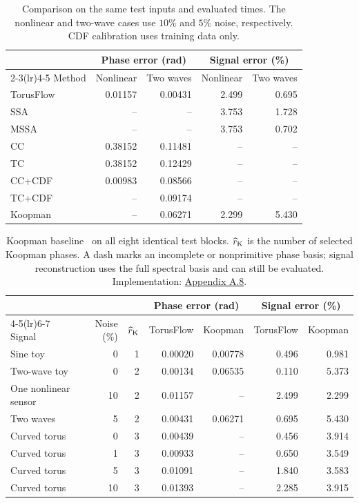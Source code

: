 \documentclass[11pt,a4paper]{article}
\begin{document}
\begin{table}[H]
\centering\small
\setlength{\tabcolsep}{9pt}
\begin{tabular}{lrrrr}
\toprule
& \multicolumn{2}{c}{Phase error (rad)} & \multicolumn{2}{c}{Signal error (\%)}\\
\cmidrule(lr){2-3}\cmidrule(lr){4-5}
Method & Nonlinear & Two waves & Nonlinear & Two waves\\
\midrule
TorusFlow & 0.01157 & 0.00431 & 2.499 & 0.695 \\
SSA & -- & -- & 3.753 & 1.728 \\
MSSA & -- & -- & 3.753 & 0.702 \\
CC & 0.38152 & 0.11481 & -- & -- \\
TC & 0.38152 & 0.12429 & -- & -- \\
CC+CDF & 0.00983 & 0.08566 & -- & -- \\
TC+CDF & -- & 0.09174 & -- & -- \\
Koopman & -- & 0.06271 & 2.299 & 5.430 \\
\bottomrule
\end{tabular}
\caption{Comparison on the same test inputs and evaluated times.
The nonlinear and two-wave cases use $10\%$ and $5\%$ noise, respectively.
CDF calibration uses training data only.}
\label{tab:experiment-baselines}
\end{table}


\begin{table}[H]
\centering\small
\setlength{\tabcolsep}{5pt}
\begin{tabular}{lrrrrrr}
\toprule
& & & \multicolumn{2}{c}{Phase error (rad)} & \multicolumn{2}{c}{Signal error (\%)}\\
\cmidrule(lr){4-5}\cmidrule(lr){6-7}
Signal & Noise (\%) & $\widehat r_{\rm K}$ & TorusFlow & Koopman & TorusFlow & Koopman\\
\midrule
Sine toy & 0 & 1 & 0.00020 & 0.00778 & 0.496 & 0.981 \\
Two-wave toy & 0 & 2 & 0.00134 & 0.06535 & 0.110 & 5.373 \\
One nonlinear sensor & 10 & 2 & 0.01157 & -- & 2.499 & 2.299 \\
Two waves & 5 & 2 & 0.00431 & 0.06271 & 0.695 & 5.430 \\
Curved torus & 0 & 3 & 0.00439 & -- & 0.456 & 3.914 \\
Curved torus & 1 & 3 & 0.00933 & -- & 0.650 & 3.549 \\
Curved torus & 5 & 3 & 0.01091 & -- & 1.840 & 3.583 \\
Curved torus & 10 & 3 & 0.01393 & -- & 2.285 & 3.915 \\
\bottomrule
\end{tabular}
\caption{Koopman baseline~\citep{Giannakis2019} on all eight identical test blocks.
$\widehat r_{\rm K}$ is the number of selected Koopman phases.
A dash marks an incomplete or nonprimitive phase basis; signal reconstruction
uses the full spectral basis and can still be evaluated.
Implementation: \hyperref[app:koopman]{Appendix A.8}.}
\label{tab:experiment-koopman}
\end{table}
\end{document}

